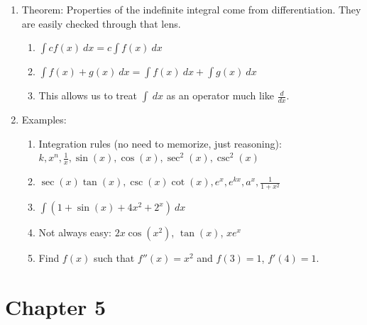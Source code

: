 \documentclass{article}
\newcommand{\ds}{\displaystyle}
\begin{document}
\begin{enumerate}
\item Theorem: Properties of the indefinite integral come from differentiation. They are easily checked through that lens.
\begin{enumerate}
\item $\ds \int cf(x) ~dx = c\int f(x) ~dx$
\item $\ds \int f(x) + g(x) ~dx = \int f(x) ~dx + \int g(x)~ dx$
\item This allows us to treat $\int ~dx$ as an operator much like $\frac{d}{dx}$.
\end{enumerate}

\item Examples:
\begin{enumerate}
\item Integration rules (no need to memorize, just reasoning): $k, x^n, \frac{1}{x}, \sin(x), \cos(x), \sec^2(x), \csc^2(x)$
\item $\sec(x)\tan(x), \csc(x)\cot(x), e^x, e^{kx}, a^x, \frac{1}{1+x^2}$
\item $\int( 1+\sin(x)+4x^2+2^x) ~dx$ 
\item Not always easy: $2x\cos(x^2)$, $\tan(x)$, $xe^x$
\item Find $f(x)$ such that $f''(x) = x^2$ and $f(3)=1$, $f'(4)=1$.
\end{enumerate}
\end{enumerate}


\section{Chapter 5}
\end{document}

